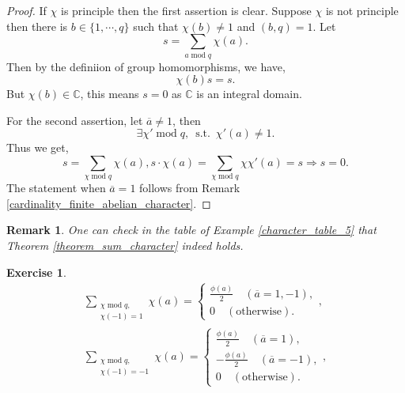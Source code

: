 \documentclass{article}
\newtheorem{remark}{Remark}[section]
\newtheorem{exercise}{Exercise}[section]
\DeclareMathOperator{\tmod}{mod}
\DeclareMathOperator{\straw}{s.t.}
\newcommand{\C}[0]{\mathbb{C}}
\newcommand{\st}[0]{\:\straw\:}
\begin{document}
\begin{proof}
  If $\chi$ is principle then the first assertion is clear. Suppose $\chi$ is not principle then there is $b\in\{1,\cdots,q\}$ such that $\chi(b)\not=1$ and $(b,q) = 1$. Let 
  \begin{equation*}
    s = \sum_{a\tmod q}\chi(a).
  \end{equation*}
  Then by the definiion of group homomorphisms, we have,
  \begin{equation*}
    \chi(b)s = s.
  \end{equation*}
  But $\chi(b)\in\C$, this means $s=0$ as $\C$ is an integral domain.
  \par For the second assertion, let $\overline{a}\not =1$, then 
  \begin{equation*}
    \exists \chi'\tmod q,\st \chi'(a) \not = 1.
  \end{equation*}
  Thus we get,
  \begin{equation*}
    s = \sum_{\chi\tmod q}\chi(a), s\cdot\chi(a) = \sum_{\chi\tmod q}\chi\chi'(a)=s\Rightarrow s = 0.
  \end{equation*}
  The statement when $\overline{a} = 1$ follows from Remark \ref{cardinality_finite_abelian_character}.
\end{proof}

\begin{remark}
  One can check in the table of Example \ref{character_table_5} that Theorem \ref{theorem_sum_character} indeed holds.
\end{remark}

\begin{exercise}
\begin{align*}
  \sum_{\substack{\chi\tmod q, \\\chi(-1) = 1}}\chi(a) = \begin{cases}
    {\frac {\phi(a)} 2}\quad (\overline{a}=1,-1),\\
    0\quad(\text{otherwise}).
  \end{cases},\\
  \sum_{\substack{\chi\tmod q, \\\chi(-1) = -1}}\chi(a) = \begin{cases}
    {\frac {\phi(a)} 2}\quad (\overline{a}=1),\\
   -{\frac {\phi(a)} 2}\quad (\overline{a}=-1),\\
    0\quad(\text{otherwise}).
  \end{cases},\\
\end{align*}
\end{exercise}
\end{document}
